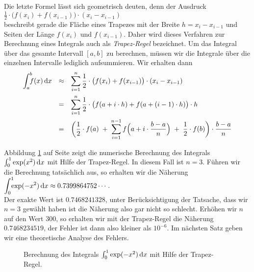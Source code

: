 Die letzte Formel l\"asst sich geometrisch deuten, denn der Ausdruck 
\\[0.2cm]
\hspace*{1.3cm}
$\frac{1}{2} \cdot  \bigl(f(x_{i}) + f(x_{i-1})\bigr) \cdot  (x_{i} - x_{i-1})$
\\[0.2cm]
beschreibt gerade die Fl\"ache eines Trapezes mit der Breite $h = x_i - x_{i-1}$ und  Seiten
der L\"ange $f(x_i)$ und $f(x_{i-1})$. Daher wird dieses Verfahren zur Berechnung eines Integrals auch als 
\emph{Trapez-Regel} bezeichnet.
Um das Integral \"uber das gesamte Intervall $[a,b]$ zu berechnen,
m\"ussen wir die Integrale \"uber die einzelnen Intervalle lediglich aufsummieren.  Wir erhalten dann 
$$
\begin{array}[t]{lcl}
 \dint{a}{b} f(x)\,\dr x & \approx & \ds
       \sum\limits_{i=1}^n \frac{1}{2} \cdot \bigl(f(x_i) + f(x_{i-1})\bigr) \cdot (x_i-x_{i-1})  
       \\[0.5cm]
 & = & \ds
       \sum\limits_{i=1}^n \frac{1}{2} \cdot \bigl(f(a+i\cdot h) + f(a+(i-1)\cdot h)\bigr) \cdot  h  \\[0.5cm]
 & = & \ds
       \biggl(\frac{1}{2}\cdot f(a) \;+\; \sum\limits_{i=1}^{n-1} f\Bigl(a+i\cdot \frac{b-a}{n}\Bigr)\;+\;\frac{1}{2}\cdot f(b)\biggr) \cdot  \frac{b-a}{n}  \\[0.5cm]
\end{array}
$$
Abbildung \ref{fig:trapezoidal.eps} auf Seite \pageref{fig:trapezoidal.eps} zeigt die
numerische Berechnung des Integrals $\int_0^1 \exp(x^2)\,\textrm{d} x $ mit Hilfe der Trapez-Regel.
In diesem Fall ist $n=3$.
F\"uhren wir die Berechnung tats\"achlich aus, so erhalten wir die N\"aherung 
\\[0.2cm]
\hspace*{1.3cm}
$\dint{0}{1} \exp(-x^2)\,\dr x \approx 0.7399864752\cdots$.
\\[0.2cm]
Der exakte Wert ist $0.7468241328$, unter Ber\"ucksichtigung der Tatsache, dass wir $n=3$
gew\"ahlt haben ist die N\"aherung also gar nicht so schlecht.   Erh\"ohen wir $n$ auf den Wert 
$300$, so erhalten wir mit der Trapez-Regel die N\"aherung $0.7468234519$, der Fehler ist
dann also kleiner als $10^{-6}$.  Im n\"achsten Satz geben wir eine theoretische Analyse des
Fehlers.

\begin{figure}[!h]
  \centering
   \caption{Berechnung des Integrals  $\int_0^1 \exp(-x^2)\, \textrm{d} x$ mit Hilfe der Trapez-Regel.}
  \label{fig:trapezoidal.eps}
\end{figure}

